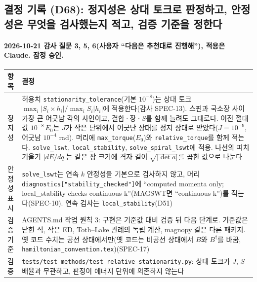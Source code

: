 \subsection{결정 기록 (D68): 정지성은 상대 토크로 판정하고, 안정성은 무엇을 검사했는지 적고, 검증 기준을 정한다}\label{decisions-d68-relative-stationarity}
\begingroup%
  \framesubtitle{2026-10-21 감사 질문 3, 5, 6(사용자 ``다음은 추천대로 진행해''), 적용은 Claude. 잠정 승인.}
  \small\renewcommand{\arraystretch}{1.12}
  \begin{tabularx}{\textwidth}{@{}P{3.0cm}Y@{}}
    \toprule
    항목 & 결정 \\
    \midrule
    정지성 & 허용치 \texttt{stationarity\_tolerance}(기본 $10^{-8}$)는 상대 토크 $\max_i|S_i\times h_i|/\max_i S_i|h_i|$에 적용한다(감사 SPEC-13). 스핀과 국소장 사이 가장 큰 어긋남 각의 사인이고, 결합·장·$S$를 함께 늘려도 그대로다. 이전 절대값 $10^{-8}\,E_0$는 $J$가 작은 단위에서 어긋난 상태를 정지 상태로 받았다($J=10^{-9}$, 어긋남 $10^{-4}$ rad). 머리에 \texttt{max\_torque}($E_0$)와 \texttt{relative\_torque}를 함께 적는다. \texttt{solve\_lswt}, \texttt{local\_stability}, \texttt{solve\_spiral\_lswt}에 적용. 나선의 피치 기울기 $|dE/dq|$는 같은 장 크기에 격자 길이 $\sqrt{|\det a|}$를 곱한 값으로 나눈다 \\
    안정성 표시 & \texttt{solve\_lswt}는 연속 $k$ 안정성을 기본으로 검사하지 않고, 머리 \texttt{diagnostics["stability\_checked"]}에 ``computed momenta only; local\_stability checks continuous k''(MAGSWT면 ``continuous k'')를 적는다(SPEC-10). 연속 검사는 \texttt{local\_stability}(D51) \\
    검증 기준 & AGENTS.md 작업 원칙 3: 구현은 기준값 대비 검증 뒤 다음 단계로. 기준값은 닫힌 식, 작은 ED, Toth--Lake 관례의 독립 계산, magnopy 같은 다른 패키지. 옛 코드 수치는 공선 상태에서만(옛 코드는 비공선 상태에서 $B$와 $B^\dagger$를 바꿈, \texttt{hamiltonian\_convention.tex})(SPEC-17) \\
    검증 & \texttt{tests/test\_methods/test\_relative\_stationarity.py}: 상대 토크가 $J$, $S$ 배율과 무관하고, 판정이 에너지 단위에 의존하지 않는다 \\
    \bottomrule
  \end{tabularx}
\endgroup

